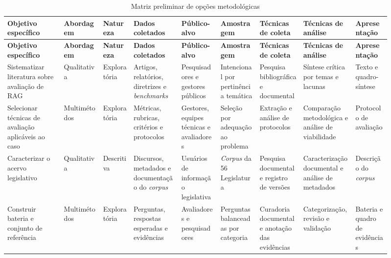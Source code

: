 \begin{landscape}
\begingroup
\scriptsize
\setlength{\tabcolsep}{1.5pt}
\begin{longtable}{@{}>{\raggedright\arraybackslash}p{0.13\linewidth}>{\raggedright\arraybackslash}p{0.095\linewidth}>{\raggedright\arraybackslash}p{0.075\linewidth}>{\raggedright\arraybackslash}p{0.115\linewidth}>{\raggedright\arraybackslash}p{0.095\linewidth}>{\raggedright\arraybackslash}p{0.09\linewidth}>{\raggedright\arraybackslash}p{0.105\linewidth}>{\raggedright\arraybackslash}p{0.125\linewidth}>{\raggedright\arraybackslash}p{0.085\linewidth}@{}}
\caption{Matriz preliminar de opções metodológicas}
\label{tab:matriz-metodologica}\\
\toprule
\textbf{Objetivo específico} & \textbf{Abordagem} & \textbf{Natureza} & \textbf{Dados coletados} & \textbf{Público-alvo} & \textbf{Amostragem} & \textbf{Técnicas de coleta} & \textbf{Técnicas de análise} & \textbf{Apresentação} \\
\midrule
\endfirsthead
\toprule
\textbf{Objetivo específico} & \textbf{Abordagem} & \textbf{Natureza} & \textbf{Dados coletados} & \textbf{Público-alvo} & \textbf{Amostragem} & \textbf{Técnicas de coleta} & \textbf{Técnicas de análise} & \textbf{Apresentação} \\
\midrule
\endhead
Sistematizar literatura sobre avaliação de RAG & Qualitativa & Exploratória & Artigos, relatórios, diretrizes e \textit{benchmarks} & Pesquisadores e gestores públicos & Intencional por pertinência temática & Pesquisa bibliográfica e documental & Síntese crítica por temas e lacunas & Texto e quadro-síntese \\
Selecionar técnicas de avaliação aplicáveis ao caso & Multimétodos & Exploratória & Métricas, rubricas, critérios e protocolos & Gestores, equipes técnicas e avaliadores & Seleção por adequação ao problema & Extração e análise de protocolos & Comparação metodológica e análise de viabilidade & Protocolo de avaliação \\
Caracterizar o acervo legislativo & Qualitativa & Descritiva & Discursos, metadados e documentação do \textit{corpus} & Usuários de informação legislativa & \textit{Corpus} da 56\textordfeminine{} Legislatura & Pesquisa documental e registro de versões & Caracterização documental e análise de metadados & Descrição do \textit{corpus} \\
Construir bateria e conjunto de referência & Multimétodos & Exploratória & Perguntas, respostas esperadas e evidências & Avaliadores e pesquisadores & Perguntas balanceadas por categoria & Curadoria documental e anotação das evidências & Categorização, revisão e validação & Bateria e quadro de evidências \\

\end{longtable}
\end{landscape}
